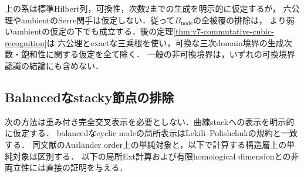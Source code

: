 \documentclass[11pt,a4paper]{ltjsarticle}
\begin{document}
\begin{remark}[二つの被覆認識の適用範囲]
上の系は標準Hilbert列，可換性，次数$2$までの生成を明示的に仮定するが，
六公理やambientのSerre関手は仮定しない．従って$B_{\mathrm{node}}$の全被覆の排除は，
より弱いambientの仮定の下でも成立する．後の定理\ref{thm:v7-commutative-cubic-recognition}は
六公理とexactな三乗根を使い，可換な三次domain境界の生成次数・飽和性に関する仮定を全て除く．
一般の非可換境界は，いずれの可換境界認識の結論にも含めない．
\end{remark}

\subsection{Balancedなstacky節点の排除}
\label{subsec:stacky-node-obstruction}

次の方法は重み付き完全交叉表示を必要としない．曲線stackへの表示を明示的に仮定する．
balancedなcyclic nodeの局所表示はLekili--Polishchuk\cite[Introduction, p.~3]{LPstack}の規約と一致する．
同文献のAuslander order上の単純対象と，以下で計算する構造層上の単純対象は区別する．
以下の局所Ext計算および有限homological dimensionとの非両立性には直接の証明を与える．
\end{document}
